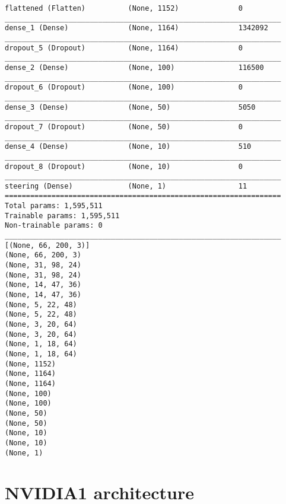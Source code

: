 \begin{verbatim}
flattened (Flatten)          (None, 1152)              0         
_________________________________________________________________
dense_1 (Dense)              (None, 1164)              1342092   
_________________________________________________________________
dropout_5 (Dropout)          (None, 1164)              0         
_________________________________________________________________
dense_2 (Dense)              (None, 100)               116500    
_________________________________________________________________
dropout_6 (Dropout)          (None, 100)               0         
_________________________________________________________________
dense_3 (Dense)              (None, 50)                5050      
_________________________________________________________________
dropout_7 (Dropout)          (None, 50)                0         
_________________________________________________________________
dense_4 (Dense)              (None, 10)                510       
_________________________________________________________________
dropout_8 (Dropout)          (None, 10)                0         
_________________________________________________________________
steering (Dense)             (None, 1)                 11        
=================================================================
Total params: 1,595,511
Trainable params: 1,595,511
Non-trainable params: 0
_________________________________________________________________
[(None, 66, 200, 3)]
(None, 66, 200, 3)
(None, 31, 98, 24)
(None, 31, 98, 24)
(None, 14, 47, 36)
(None, 14, 47, 36)
(None, 5, 22, 48)
(None, 5, 22, 48)
(None, 3, 20, 64)
(None, 3, 20, 64)
(None, 1, 18, 64)
(None, 1, 18, 64)
(None, 1152)
(None, 1164)
(None, 1164)
(None, 100)
(None, 100)
(None, 50)
(None, 50)
(None, 10)
(None, 10)
(None, 1)
\end{verbatim}
\section{NVIDIA1 architecture}

